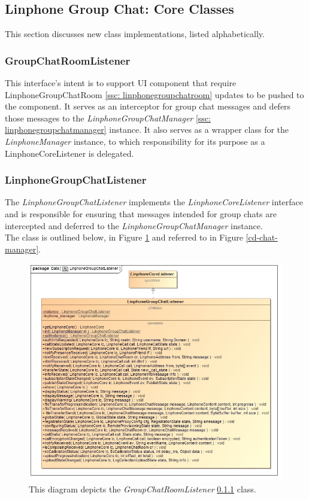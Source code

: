 \documentclass[11pt]{article}
\begin{document}
\subsection{Linphone Group Chat: Core Classes}
This section discusses new class implementations, listed alphabetically.

\subsubsection{GroupChatRoomListener}\label{ssc: groupchatroomlistener}
This interface's intent is to support UI component that require LinphoneGroupChatRoom \ref{ssc: linphonegroupchatroom} updates to be pushed to the component. It serves as an interceptor for group chat messages and defers those messages to the \textit{LinphoneGroupChatManager} \ref{ssc: linphonegroupchatmanager} instance. It also serves as a wrapper class for the \textit{LinphoneManager} instance, to which responsibility for its purpose as a {LinphoneCoreListener} is delegated.

\subsubsection{LinphoneGroupChatListener}\label{ssc: linphonegroupchatlistener}
The \textit{LinphoneGroupChatListener} implements the \textit{LinphoneCoreListener} interface and is responsible for ensuring that messages intended for group chats are intercepted and deferred to the \textit{LinphoneGroupChatManager} instance. \\
The class is outlined below, in Figure \ref{cd_linphone_group_chat_listener} and referred to in Figure \ref{cd-chat-manager}.
\begin{figure}[H]
	\centering
	\centering
	\centerline{\includegraphics[width=6in]{./images/class_linphone_group_chat_listener.jpg}}
	\caption[LinphoneGroupChatListener Class Diagram]{This diagram depicts the \textit{GroupChatRoomListener} \ref{ssc: groupchatroomlistener} class.}
	\label{cd_linphone_group_chat_listener}
\end{figure}
\end{document}
